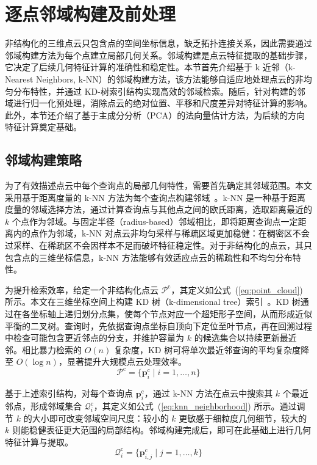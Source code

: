 \section{逐点邻域构建及前处理}

非结构化的三维点云只包含点的空间坐标信息，缺乏拓扑连接关系，因此需要通过邻域构建方法为每个点建立局部几何关系。邻域构建是点云特征提取的基础步骤，它决定了后续几何特征计算的准确性和稳定性。本节首先介绍基于 k 近邻（k-Nearest Neighbors, k-NN）的邻域构建方法，该方法能够自适应地处理点云的非均匀分布特性，并通过 KD-树索引结构实现高效的邻域检索。随后，针对构建的邻域进行归一化预处理，消除点云的绝对位置、平移和尺度差异对特征计算的影响。此外，本节还介绍了基于主成分分析（PCA）的法向量估计方法，为后续的方向特征计算奠定基础。

\subsection{邻域构建策略}
\label{sec:neighbor_define}

为了有效描述点云中每个查询点的局部几何特性，需要首先确定其邻域范围。本文采用基于距离度量的 k-NN 方法为每个查询点构建邻域~\cite{cover_nearest_1967}。k-NN 是一种基于距离度量的邻域选择方法，通过计算查询点与其他点之间的欧氏距离，选取距离最近的 $k$ 个点作为邻域。与固定半径（radius-based）邻域相比，即将距离查询点一定距离内的点作为邻域，k-NN 对点云非均匀采样与稀疏区域更加稳健：在稠密区不会过采样、在稀疏区不会因样本不足而破坏特征稳定性。对于非结构化的点云，其只包含点的三维坐标信息，k-NN 方法能够有效适应点云的稀疏性和不均匀分布特性。

为提升检索效率，给定一个非结构化点云 $\mathcal{P}^\text{c}$，其定义如公式~(\ref{eq:point_cloud}) 所示。本文在三维坐标空间上构建 KD 树（k-dimensional tree）索引~\cite{brown_review_2025a}。KD 树通过在各坐标轴上递归划分点集，使每个节点对应一个超矩形子空间，从而形成近似平衡的二叉树。查询时，先依据查询点坐标自顶向下定位至叶节点，再在回溯过程中检查可能包含更近邻点的分支，并维护容量为 $k$ 的候选集合以持续更新最近邻。相比暴力检索的 $O(n)$ 复杂度，KD 树可将单次最近邻查询的平均复杂度降至 $O(\log n)$，显著提升大规模点云处理效率。
\begin{equation}
    \mathcal{P}^\text{c} = \{\mathbf{p}_i^\text{c} \mid i = 1, \dots, n\}
     \label{eq:point_cloud}
\end{equation}

基于上述索引结构，对每个查询点 $\mathbf{p}_i^\text{c}$，通过 k-NN 方法在点云中搜索其 $k$ 个最近邻点，形成邻域集合 $\mathcal{Q}_i^\text{c}$，其定义如公式~(\ref{eq:knn_neighborhood}) 所示。通过调节 $k$ 的大小即可改变邻域空间尺度：较小的 $k$ 更敏感于细粒度几何细节，较大的 $k$ 则能稳健表征更大范围的局部结构。邻域构建完成后，即可在此基础上进行几何特征计算与提取。
\begin{equation}
    \mathcal{Q}_i^\text{c} = \{\mathbf{p}_{i,j}^\text{c} \mid j = 1, \dots, k\}
     \label{eq:knn_neighborhood}
\end{equation}

